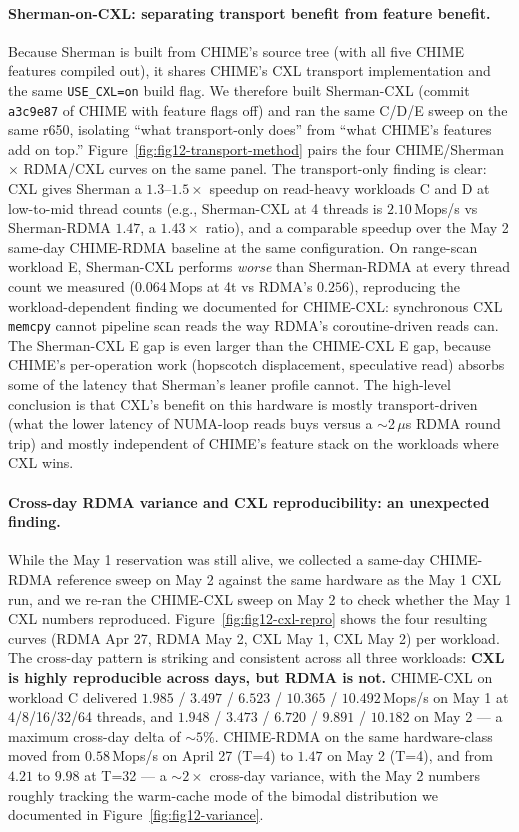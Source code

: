 \documentclass[11pt,a4paper]{article}
\begin{document}
\paragraph{Sherman-on-CXL: separating transport benefit from feature benefit.} Because Sherman is built from CHIME's source tree (with all five CHIME features compiled out), it shares CHIME's CXL transport implementation and the same \texttt{USE\_CXL=on} build flag. We therefore built Sherman-CXL (commit \texttt{a3c9e87} of CHIME with feature flags off) and ran the same C/D/E sweep on the same r650, isolating ``what transport-only does'' from ``what CHIME's features add on top.'' Figure~\ref{fig:fig12-transport-method} pairs the four CHIME/Sherman $\times$ RDMA/CXL curves on the same panel. The transport-only finding is clear: CXL gives Sherman a $1.3$--$1.5\times$ speedup on read-heavy workloads C and D at low-to-mid thread counts (e.g., Sherman-CXL at 4 threads is $2.10$\,Mops/s vs Sherman-RDMA $1.47$, a $1.43\times$ ratio), and a comparable speedup over the May 2 same-day CHIME-RDMA baseline at the same configuration. On range-scan workload E, Sherman-CXL performs \emph{worse} than Sherman-RDMA at every thread count we measured ($0.064$\,Mops at 4t vs RDMA's $0.256$), reproducing the workload-dependent finding we documented for CHIME-CXL: synchronous CXL \texttt{memcpy} cannot pipeline scan reads the way RDMA's coroutine-driven reads can. The Sherman-CXL E gap is even larger than the CHIME-CXL E gap, because CHIME's per-operation work (hopscotch displacement, speculative read) absorbs some of the latency that Sherman's leaner profile cannot. The high-level conclusion is that CXL's benefit on this hardware is mostly transport-driven (what the lower latency of NUMA-loop reads buys versus a $\sim$2\,$\mu$s RDMA round trip) and mostly independent of CHIME's feature stack on the workloads where CXL wins.

\paragraph{Cross-day RDMA variance and CXL reproducibility: an unexpected finding.} While the May 1 reservation was still alive, we collected a same-day CHIME-RDMA reference sweep on May 2 against the same hardware as the May 1 CXL run, and we re-ran the CHIME-CXL sweep on May 2 to check whether the May 1 CXL numbers reproduced. Figure~\ref{fig:fig12-cxl-repro} shows the four resulting curves (RDMA Apr 27, RDMA May 2, CXL May 1, CXL May 2) per workload. The cross-day pattern is striking and consistent across all three workloads: \textbf{CXL is highly reproducible across days, but RDMA is not.} CHIME-CXL on workload C delivered $1.985$ / $3.497$ / $6.523$ / $10.365$ / $10.492$\,Mops/s on May 1 at 4/8/16/32/64 threads, and $1.948$ / $3.473$ / $6.720$ / $9.891$ / $10.182$ on May 2 --- a maximum cross-day delta of $\sim 5\%$. CHIME-RDMA on the same hardware-class moved from $0.58$\,Mops/s on April 27 (T=4) to $1.47$ on May 2 (T=4), and from $4.21$ to $9.98$ at T=32 --- a $\sim 2\times$ cross-day variance, with the May 2 numbers roughly tracking the warm-cache mode of the bimodal distribution we documented in Figure~\ref{fig:fig12-variance}.
\end{document}
